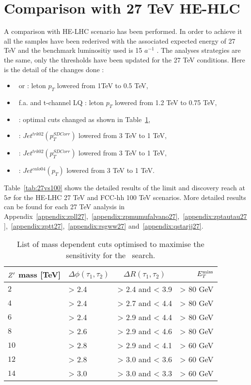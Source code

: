 \section{Comparison with 27 TeV HE-HLC}
\label{sec:ana27tev}
A comparison with HE-LHC scenario has been performed.
In order to achieve it all the samples have been rederived with the associated expected energy of 27 TeV and the benchmark luminositiy used is 15 $a^{-1}$ .
\newline
The analyses strategies are the same, only the thresholds have been updated for the 27 TeV conditions. Here is the detail of the changes done :
\begin{itemize}
\item \Zpee\ or \Zpmumu : leton $p_T$ lowered from 1TeV to 0.5 TeV,
\item \Zpmumu\ f.a. and t-channel LQ : leton $p_T$ lowered from  1.2 TeV to 0.75 TeV,
\item \Zptata\ : optimal cuts changed as shown in Table~\ref{tab:leptonicresonances:selectiontautau27},
\item \rsg\ : $Jet^{trk02}(p_T^{SD Corr})$ lowered from 3 TeV to 1 TeV,
\item \Zptt\ : $Jet^{trk02}(p_T^{SD Corr})$ lowered from 3 TeV to 1 TeV,
\item \qjj\ : $Jet^{calo04}(p_T)$ lowered from 3 TeV to 1 TeV.
\end{itemize}

Table~\ref{tab:27vs100} shows the detailed results of the limit and discovery reach at $5\sigma$ for the HE-LHC 27 TeV and FCC-hh 100 TeV scenarios. More detailed results can be found for each 27 TeV analysis in Appendix~\ref{appendix:zpll27},~\ref{appendix:zpmumufalvano27},~\ref{appendix:zptautau27},~\ref{appendix:zptt27},~\ref{appendix:rsgww27}  and~\ref{appendix:qstarjj27}.

\begin{table}[htbp]
   \centering
\begin{tabular}{|l|l|c|r|}
  \hline
  \hline
   $Z^{\prime}$ mass [TeV] &  $\Delta \phi(\tau_1, \tau_2)$&  $\Delta R(\tau_1, \tau_2)$ & $E_{T}^{\rm{miss}}$\\
  \hline
   $2$ & > 2.4 & > 2.4 and < 3.9 & > 80 GeV\\
   $4$ & > 2.4 & > 2.7 and < 4.4 & > 80 GeV\\
   $6$ & > 2.4 & > 2.9 and < 4.4 & > 80 GeV\\
   $8$ & > 2.6 & > 2.9 and < 4.6 & > 80 GeV\\
  $10$ & > 2.8 & > 2.9 and < 4.1 & > 60 GeV\\
  $12$ & > 2.8 & > 3.0 and < 3.6 & > 60 GeV\\
  $14$ & > 3.0 & > 3.0 and < 3.3 & > 60 GeV\\
  \hline
  \hline
  \end{tabular}
  \caption{List of mass dependent cuts optimised to maximise the sensitivity for the \Zptata\ search.}
  \label{tab:leptonicresonances:selectiontautau27}
\end{table}

